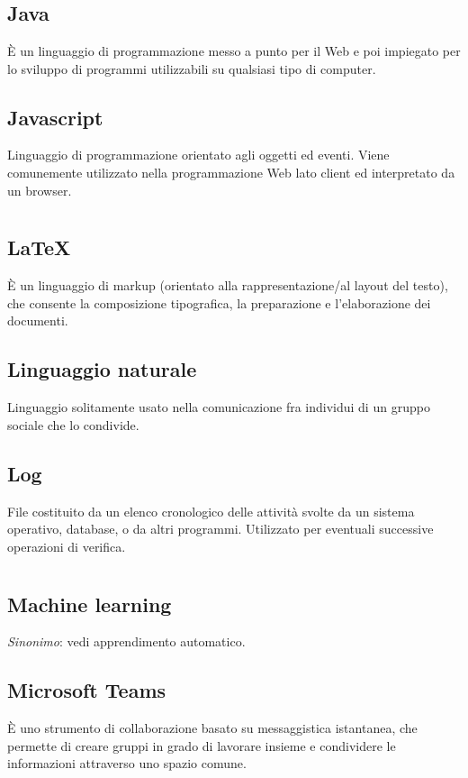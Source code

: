 \section[J]{}
	\subsection*{Java}
	È un linguaggio di programmazione messo a punto per il Web e poi impiegato per lo sviluppo di programmi utilizzabili su qualsiasi tipo di computer.
	\subsection*{Javascript}
	Linguaggio di programmazione orientato agli oggetti ed eventi. Viene comunemente utilizzato nella programmazione Web lato client ed interpretato da un browser.
\pagebreak
\section[L]{}
	\subsection*{\LaTeX{}}
	È un linguaggio di markup (orientato alla rappresentazione/al layout del testo), che consente la composizione tipografica, la preparazione e l'elaborazione dei documenti.
	\subsection*{Linguaggio naturale}
	Linguaggio solitamente usato nella comunicazione fra individui di un gruppo sociale che lo condivide.
	\subsection*{Log}
	File costituito da un elenco cronologico delle attività svolte da un sistema operativo, database, o da altri programmi. Utilizzato per eventuali successive operazioni di verifica.
\pagebreak
\section[M]{}
	\subsection*{Machine learning}
	\emph{Sinonimo}: vedi apprendimento automatico.
	\subsection*{Microsoft Teams}
	È uno strumento di collaborazione basato su messaggistica istantanea, che permette di creare gruppi in grado di lavorare insieme e condividere le informazioni attraverso uno spazio comune.
